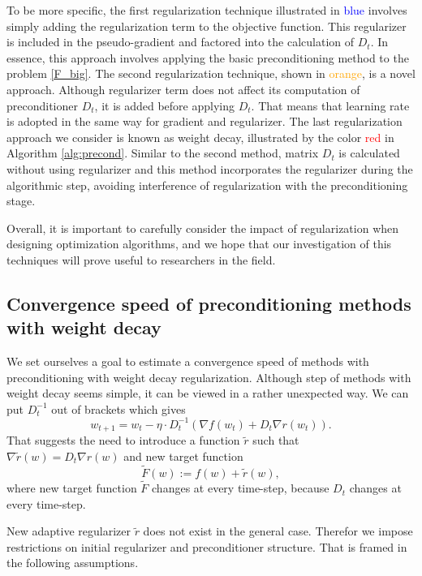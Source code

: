 \documentclass[USenglish]{article}
\theoremstyle{dgthm}
\theoremstyle{dgdef}
\begin{document}
To be more specific, the first regularization technique illustrated in \textcolor{blue}{blue} involves simply adding the regularization term to the objective function. This regularizer is included in the pseudo-gradient and factored into the calculation of $D_t$. In essence, this approach involves applying the basic preconditioning method to the problem \eqref{F_big}.
The second regularization technique, shown in \textcolor{orange}{orange}, is a novel approach. Although regularizer term does not affect its computation of preconditioner $D_t$, it is added before applying $D_t$. That means that learning rate is adopted in the same way for gradient and regularizer.
The last regularization approach we consider is known as weight decay, illustrated by the color \textcolor{red}{red} in Algorithm \ref{alg:precond}.
Similar to the second method, matrix $D_t$ is calculated without using regularizer and this method incorporates the regularizer during the algorithmic step, avoiding interference of regularization with the preconditioning stage.

Overall, it is important to carefully consider the impact of regularization when designing optimization algorithms, and we hope that our investigation of this techniques will prove useful to researchers in the field.


\subsection{Convergence speed of preconditioning methods with weight decay}

We set ourselves a goal to estimate a convergence speed of methods with preconditioning with weight decay regularization.
Although step of methods with weight decay seems simple, it can be viewed in a rather unexpected way. We can put $D_t^{-1}$ out of brackets which gives
\begin{equation}
w_{t+1} = w_t - \eta \cdot D_t^{-1} (\nabla f(w_t) + D_t \nabla r(w_t)).
\end{equation}
That suggests the need to introduce a function $\tilde{r}$ such that $\nabla \tilde{r}(w) = D_t \nabla r(w)$ and new target function
\begin{equation} \label{F_tilde}
    \tilde{F}(w) := f(w) + \tilde{r}(w),
\end{equation}
where new target function $\widetilde{F}$ changes at every time-step, because $D_t$ changes at every time-step.

New adaptive regularizer $\widetilde{r}$ does not exist in the general case. Therefor we impose restrictions on initial regularizer and preconditioner structure. That is framed in the following assumptions.
\end{document}
